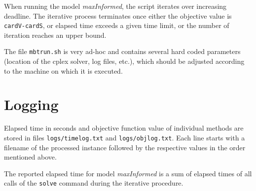 \documentclass[12pt]{article}
\begin{document}
When running the model \emph{maxInformed}, the script iterates over increasing deadline. 
The iterative process terminates once either the objective value is \texttt{cardV-cardS}, or elapsed time exceeds a given time limit, or the number of iteration reaches an upper bound.

The file \texttt{mbtrun.sh} is very ad-hoc and contains several hard coded parameters (location of the cplex solver, log files, etc.), 
which should be adjusted according to the machine on which it is executed.

\section{Logging}

Elapsed time in seconds and objective function value of individual methods are stored in files \texttt{logs/timelog.txt} and \texttt{logs/objlog.txt}.
Each line starts with a filename of the processed instance followed by the respective values in the order mentioned above.

The reported elapsed time for model \emph{maxInformed} is a sum of elapsed times of all calls of the \texttt{solve} command during the iterative procedure.
\end{document}
